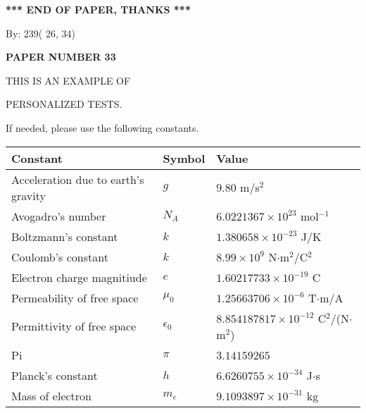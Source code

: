 \documentclass[12pt]{article}
\begin{document}
   
   
   
   
\vspace{1.0in} 
{\textbf{\large{ *** END OF PAPER, THANKS *** }}} 
   
   
\hspace{1.0in} By: 
         239(         26,          34)
   
   
   
   
\newpage 
\setcounter{page}{ 
    33001 } 
   
   
   
   
 {\textbf{ \Large{ PAPER NUMBER          33 }}}
   
   
\vspace{0.2in}
   
   
   
   
   
   
 \vspace{0.2in}
 
 
{\Huge  THIS IS AN EXAMPLE OF}
 
{\Huge  PERSONALIZED TESTS. }
 
If needed, please use the following constants.
 
 
 
\noindent\begin{tabular}{|l|l|l|}
\hline
Constant & Symbol & Value \\
\hline
Acceleration due to earth's gravity &
$g$ &
 $ 9.80 $
m/s$^2$ \\
\hline
Avogadro's number &
$N_A$ &
 $ 6.0221367 \times 10^{23} $
mol$^{-1}$ \\
\hline
Boltzmann's constant &
$k$ &
 $ 1.380658 \times 10^{-23} $
J/K \\
\hline
Coulomb's constant &
$k$ &
 $ 8.99 \times 10^{9} $
N$\cdot $m$^2$/C$^2$ \\
\hline
Electron charge magnitiude &
$e$ &
 $ 1.60217733 \times 10^{-19} $
C \\
\hline
Permeability of free space &
$\mu _0$ &
 $ 1.25663706 \times 10^{-6} $
T$\cdot $m/A \\
\hline
Permittivity of free space &
$\epsilon _0$ &
 $ 8.854187817 \times 10^{-12} $
C$^2$/(N$\cdot $m$^2$) \\
\hline
Pi &
$\pi$ &
 $ 3.14159265 $
$ $ \\
\hline
Planck's constant &
$h$ &
 $ 6.6260755 \times 10^{-34} $
J$\cdot $s \\
\hline
Mass of electron &
$m_e$ &
 $ 9.1093897 \times 10^{-31} $
kg \\
\hline
\end{tabular}
 
\end{document}
